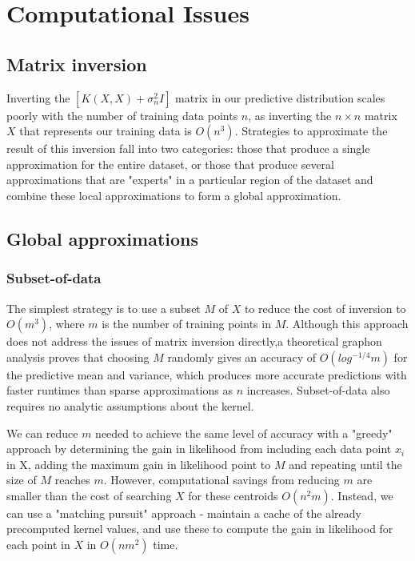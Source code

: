 \section{Computational Issues}


\subsection{Matrix inversion \cite{big-data}}
Inverting the $[K(X,X) + \sigma^2_nI]$ matrix in our predictive distribution scales poorly with the number of training data points $n$, as inverting the $n \times n$ matrix $X$ that represents our training data is $O(n^3)$. Strategies to approximate the result of this inversion fall into two categories: those that produce a single approximation for the entire dataset, or those that produce several approximations that are "experts" in a particular region of the dataset and combine these local approximations to form a global approximation.

\subsection{Global approximations}

\subsubsection{Subset-of-data}
The simplest strategy is to use a subset $M$ of $X$ to reduce the cost of inversion to $O(m^3)$, where $m$ is the number of training points in $M$. Although this approach does not address the issues of matrix inversion directly,a theoretical graphon analysis proves that choosing $M$ randomly gives an accuracy of $O(log^{-1/4}m)$ for the predictive mean and variance, which produces more accurate predictions with faster runtimes than sparse approximations as $n$ increases. \cite{random-subsampling} Subset-of-data also requires no analytic assumptions about the kernel.


We can reduce $m$ needed to achieve the same level of accuracy with a "greedy" approach by determining the gain in likelihood from including each data point $x_i$ in X, adding the maximum gain in likelihood point to $M$ and repeating until the size of $M$ reaches $m$. However, computational savings from reducing $m$ are smaller than the cost of searching $X$ for these centroids $O(n^2m)$. Instead, we can use a "matching pursuit" approach - maintain a cache of the already precomputed kernel values, and use these to compute the gain in likelihood for each point in $X$ in $O(nm^2)$ time. \cite{matching-pursuit}

